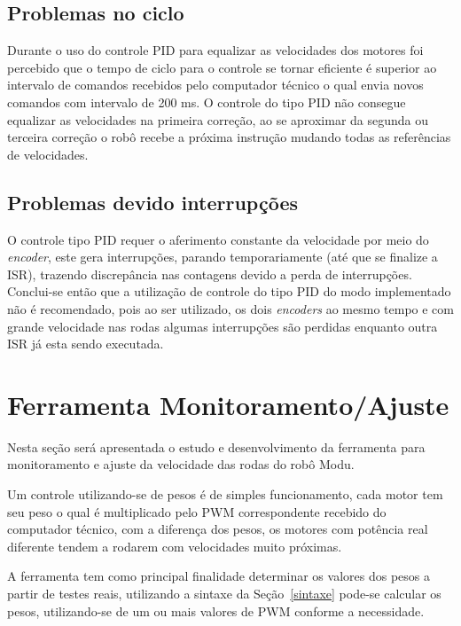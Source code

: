 \documentclass[a4paper,12pt,portuguese]{ufms-cpcx}
\begin{document}
\subsection{Problemas no ciclo}
Durante o uso do controle PID para equalizar as velocidades dos motores foi percebido que o tempo de ciclo para o controle se tornar eficiente é superior ao intervalo de comandos recebidos pelo computador técnico o qual envia novos comandos com intervalo de 200 ms. O controle do tipo PID não consegue equalizar as velocidades na primeira correção, ao se aproximar da segunda ou terceira correção o robô recebe a próxima instrução mudando todas as referências de velocidades.

\subsection{Problemas devido interrupções}
O controle tipo PID requer o aferimento constante da velocidade por meio do \textit{encoder}, este gera interrupções, parando temporariamente (até que se finalize a ISR), trazendo discrepância nas contagens devido a perda de interrupções.
Conclui-se então que a utilização de controle do tipo PID do modo implementado não é recomendado, pois ao ser utilizado, os dois \textit{encoders} ao mesmo tempo e com grande velocidade nas rodas algumas interrupções são perdidas enquanto outra ISR já esta sendo executada.

\section{Ferramenta Monitoramento/Ajuste}
Nesta seção será apresentada o estudo e desenvolvimento da ferramenta para monitoramento e ajuste da velocidade das rodas do robô Modu. 

Um controle utilizando-se de pesos é de simples funcionamento, cada motor tem seu peso o qual é multiplicado pelo PWM correspondente recebido do computador técnico, com a diferença dos pesos, os motores com potência real diferente tendem a rodarem com velocidades muito próximas. 

A ferramenta tem como principal finalidade determinar os valores dos pesos a partir de testes reais, utilizando a sintaxe da Seção~\ref{sintaxe} pode-se calcular os pesos, utilizando-se de um ou mais valores de PWM conforme a necessidade.
 
\end{document}
